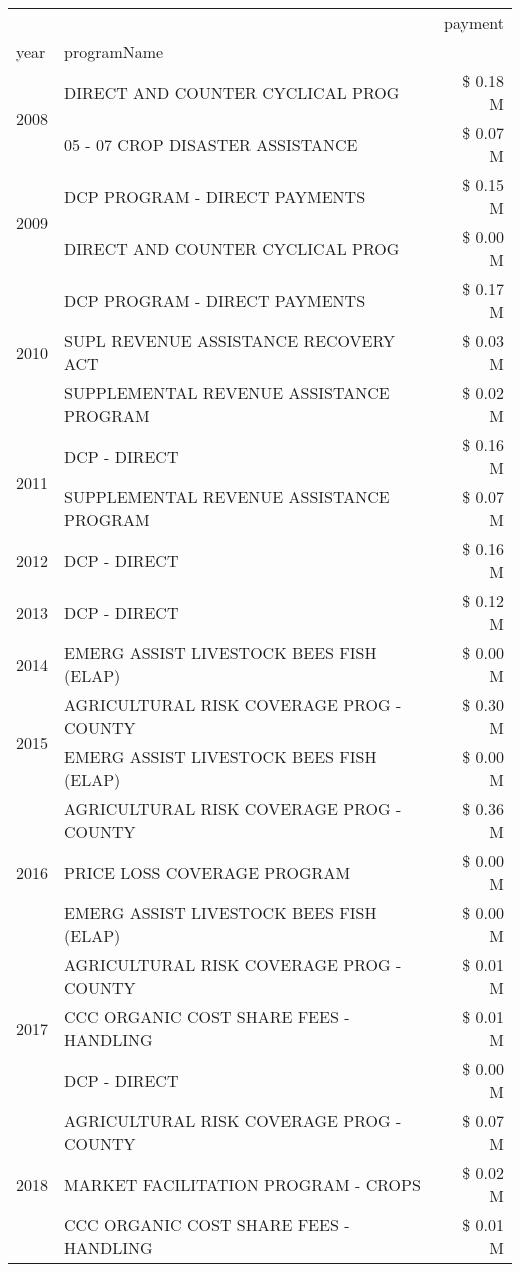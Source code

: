 \begin{tabular}{llr}
\toprule
 &  & payment \\
year & programName &  \\
\midrule
\multirow[t]{2}{*}{2008} & DIRECT AND COUNTER CYCLICAL PROG & \$ 0.18 M \\
 & 05 - 07 CROP DISASTER ASSISTANCE & \$ 0.07 M \\
\cline{1-3}
\multirow[t]{2}{*}{2009} & DCP PROGRAM - DIRECT PAYMENTS & \$ 0.15 M \\
 & DIRECT AND COUNTER CYCLICAL PROG & \$ 0.00 M \\
\cline{1-3}
\multirow[t]{3}{*}{2010} & DCP PROGRAM - DIRECT PAYMENTS & \$ 0.17 M \\
 & SUPL REVENUE ASSISTANCE RECOVERY ACT & \$ 0.03 M \\
 & SUPPLEMENTAL REVENUE ASSISTANCE PROGRAM & \$ 0.02 M \\
\cline{1-3}
\multirow[t]{2}{*}{2011} & DCP - DIRECT & \$ 0.16 M \\
 & SUPPLEMENTAL REVENUE ASSISTANCE PROGRAM & \$ 0.07 M \\
\cline{1-3}
2012 & DCP - DIRECT & \$ 0.16 M \\
\cline{1-3}
2013 & DCP - DIRECT & \$ 0.12 M \\
\cline{1-3}
2014 & EMERG ASSIST LIVESTOCK BEES FISH (ELAP) & \$ 0.00 M \\
\cline{1-3}
\multirow[t]{2}{*}{2015} & AGRICULTURAL RISK COVERAGE PROG - COUNTY & \$ 0.30 M \\
 & EMERG ASSIST LIVESTOCK BEES FISH (ELAP) & \$ 0.00 M \\
\cline{1-3}
\multirow[t]{3}{*}{2016} & AGRICULTURAL RISK COVERAGE PROG - COUNTY      & \$ 0.36 M \\
 & PRICE LOSS COVERAGE PROGRAM                   & \$ 0.00 M \\
 & EMERG ASSIST LIVESTOCK BEES FISH (ELAP)       & \$ 0.00 M \\
\cline{1-3}
\multirow[t]{3}{*}{2017} & AGRICULTURAL RISK COVERAGE PROG - COUNTY & \$ 0.01 M \\
 & CCC ORGANIC COST SHARE FEES - HANDLING & \$ 0.01 M \\
 & DCP - DIRECT & \$ 0.00 M \\
\cline{1-3}
\multirow[t]{3}{*}{2018} & AGRICULTURAL RISK COVERAGE PROG - COUNTY & \$ 0.07 M \\
 & MARKET FACILITATION PROGRAM - CROPS & \$ 0.02 M \\
 & CCC ORGANIC COST SHARE FEES - HANDLING & \$ 0.01 M \\

\end{tabular}
